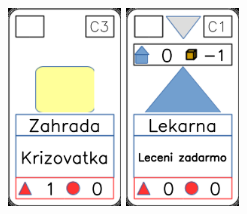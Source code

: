 \documentclass[a4paper]{article}
\begin{document}
	\includegraphics[width=3.0cm]{img-2_27}
	\includegraphics[width=3.0cm]{img-3_10}
\end{document}
